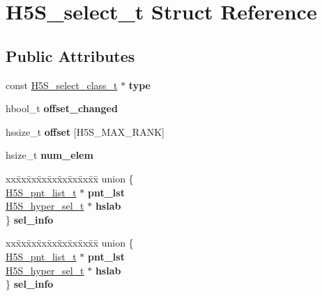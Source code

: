\hypertarget{struct_h5_s__select__t}{}\section{H5\+S\+\_\+select\+\_\+t Struct Reference}
\label{struct_h5_s__select__t}
\subsection*{Public Attributes}
\begin{DoxyCompactItemize}
\item 
\mbox{\label{struct_h5_s__select__t_af0fcaea69e12bb09d99c2d8fc05d546c}} 
const \hyperlink{struct_h5_s__select__class__t}{H5\+S\+\_\+select\+\_\+class\+\_\+t} $\ast$ {\bfseries type}
\item 
\mbox{\label{struct_h5_s__select__t_a90541e85207aece9734550b48a8425e2}} 
hbool\+\_\+t {\bfseries offset\+\_\+changed}
\item 
\mbox{\label{struct_h5_s__select__t_ae95d8f91f2c183b3275fa2093ae37c51}} 
hssize\+\_\+t {\bfseries offset} \mbox{[}H5\+S\+\_\+\+M\+A\+X\+\_\+\+R\+A\+NK\mbox{]}
\item 
\mbox{\label{struct_h5_s__select__t_a1f24540d3eb6426c4037d3b0626ed889}} 
hsize\+\_\+t {\bfseries num\+\_\+elem}
\item 
\mbox{\label{struct_h5_s__select__t_a5d5b0426b6eb0057250187c6f802978e}} 
\begin{tabbing}
xx\=xx\=xx\=xx\=xx\=xx\=xx\=xx\=xx\=\kill
union \{\\
\>\hyperlink{struct_h5_s__pnt__list__t}{H5S\_pnt\_list\_t} $\ast$ {\bfseries pnt\_lst}\\
\>\hyperlink{struct_h5_s__hyper__sel__t}{H5S\_hyper\_sel\_t} $\ast$ {\bfseries hslab}\\
\} {\bfseries sel\_info}\\

\end{tabbing}\item 
\mbox{\label{struct_h5_s__select__t_ae90de9f06afe9a8ba5f5a66909c58b86}} 
\begin{tabbing}
xx\=xx\=xx\=xx\=xx\=xx\=xx\=xx\=xx\=\kill
union \{\\
\>\hyperlink{struct_h5_s__pnt__list__t}{H5S\_pnt\_list\_t} $\ast$ {\bfseries pnt\_lst}\\
\>\hyperlink{struct_h5_s__hyper__sel__t}{H5S\_hyper\_sel\_t} $\ast$ {\bfseries hslab}\\
\} {\bfseries sel\_info}\\

\end{tabbing}\end{DoxyCompactItemize}


